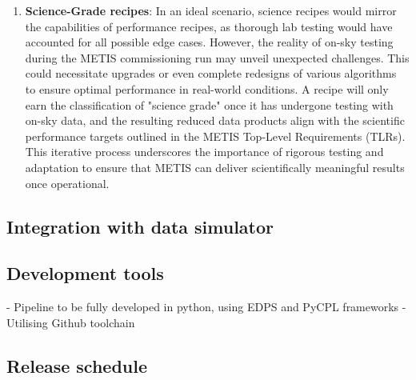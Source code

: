 \documentclass[a4paper]{spie}  %
\begin{document}
\begin{enumerate}
     \item \textbf{Science-Grade recipes}: In an ideal scenario, science recipes would mirror the capabilities of performance recipes, as thorough lab testing would have accounted for all possible edge cases. However, the reality of on-sky testing during the METIS commissioning run may unveil unexpected challenges. This could necessitate upgrades or even complete redesigns of various algorithms to ensure optimal performance in real-world conditions. A recipe will only earn the classification of "science grade" once it has undergone testing with on-sky data, and the resulting reduced data products align with the scientific performance targets outlined in the METIS Top-Level Requirements (TLRs). This iterative process underscores the importance of rigorous testing and adaptation to ensure that METIS can deliver scientifically meaningful results once operational. 
 \end{enumerate}



\subsection{Integration with data simulator}
\label{subsec:imp_sim}





\subsection{Development tools}
\label{subsec:imp_tools}
- Pipeline to be fully developed in python, using EDPS and PyCPL frameworks
- Utilising Github toolchain

\subsection{Release schedule}
\label{subsec:imp_schedule}
\end{document}
